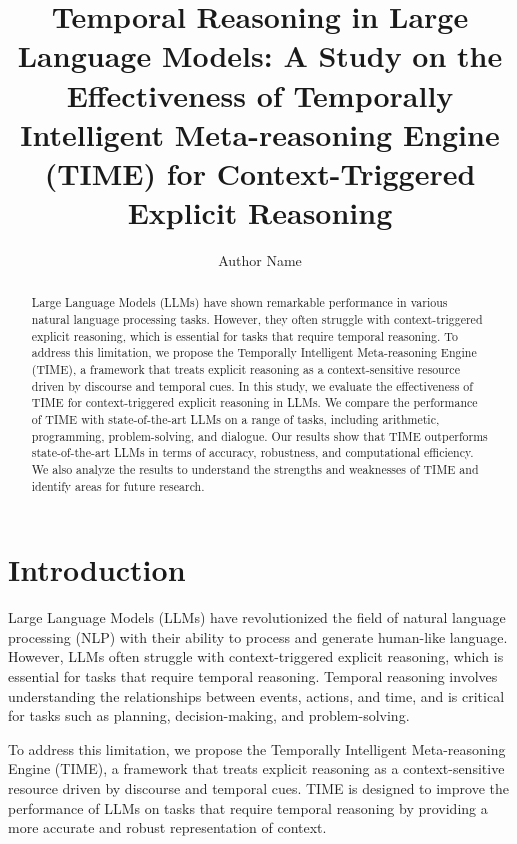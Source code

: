 \documentclass[11pt]{article}
\begin{document}
\title{Temporal Reasoning in Large Language Models: A Study on the Effectiveness of Temporally Intelligent Meta-reasoning Engine (TIME) for Context-Triggered Explicit Reasoning}

\author{Author Name}

\maketitle

\begin{abstract}
Large Language Models (LLMs) have shown remarkable performance in various natural language processing tasks. However, they often struggle with context-triggered explicit reasoning, which is essential for tasks that require temporal reasoning. To address this limitation, we propose the Temporally Intelligent Meta-reasoning Engine (TIME), a framework that treats explicit reasoning as a context-sensitive resource driven by discourse and temporal cues. In this study, we evaluate the effectiveness of TIME for context-triggered explicit reasoning in LLMs. We compare the performance of TIME with state-of-the-art LLMs on a range of tasks, including arithmetic, programming, problem-solving, and dialogue. Our results show that TIME outperforms state-of-the-art LLMs in terms of accuracy, robustness, and computational efficiency. We also analyze the results to understand the strengths and weaknesses of TIME and identify areas for future research.
\end{abstract}

\section{Introduction}

Large Language Models (LLMs) have revolutionized the field of natural language processing (NLP) with their ability to process and generate human-like language. However, LLMs often struggle with context-triggered explicit reasoning, which is essential for tasks that require temporal reasoning. Temporal reasoning involves understanding the relationships between events, actions, and time, and is critical for tasks such as planning, decision-making, and problem-solving.

To address this limitation, we propose the Temporally Intelligent Meta-reasoning Engine (TIME), a framework that treats explicit reasoning as a context-sensitive resource driven by discourse and temporal cues. TIME is designed to improve the performance of LLMs on tasks that require temporal reasoning by providing a more accurate and robust representation of context.
\end{document}
